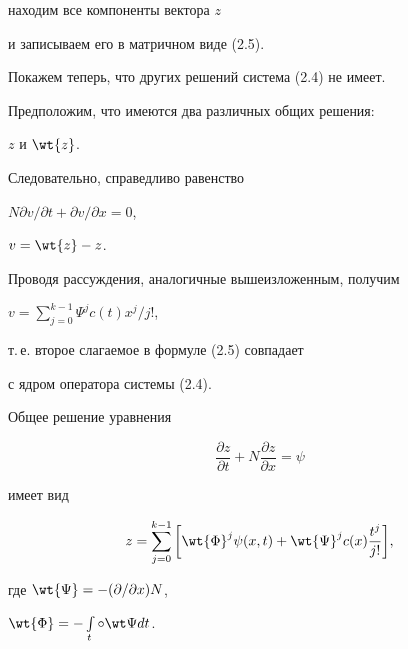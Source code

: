 \begin{pf}
находим все компоненты вектора $z$


и записываем его в матричном виде (2.5).





Покажем теперь, что других решений система (2.4) не имеет.


Предположим, что имеются два различных общих решения:


$z$ и $\wt{z}$.


Следовательно, справедливо равенство


$N\partial v/\partial t+\partial v/\partial x=0$,


$v=\wt{z}-z$.


Проводя рассуждения, аналогичные вышеизложенным, получим


$v=\sum\limits_{j=0}^{k-1}\Psi ^{j}c(t)x^{j}/j!$,


т.\,е. второе слагаемое в формуле (2.5) совпадает


с ядром оператора системы (2.4).


\end{pf}





\begin{cors}


Общее решение уравнения


$$


\frac{\partial z}{\partial t}+


N\frac{\partial z}{\partial x}=\psi


$$


имеет вид


$$


z=\sum_{j=0}^{k-1}\bigg[\wt {\Phi }^{j}\psi (x,t)+


\wt {\Psi }^{j}c(x)\frac{t^{j}}{j!}\bigg],


$$


где $\wt {\Psi }=-(\partial/\partial x)N$,


$\wt {\Phi }=-\int\limits_{t}\circ \wt\Psi dt$.


\end{cors}





